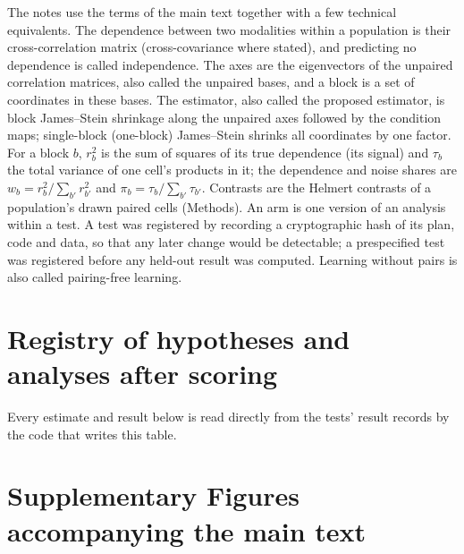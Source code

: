 \documentclass[10pt,a4paper]{article}
\begin{document}
The notes use the terms of the main text together with a few technical equivalents. The dependence between two modalities within a population is their cross-correlation matrix (cross-covariance where stated), and predicting no dependence is called independence. The axes are the eigenvectors of the unpaired correlation matrices, also called the unpaired bases, and a block is a set of coordinates in these bases. The estimator, also called the proposed estimator, is block James--Stein shrinkage along the unpaired axes followed by the condition maps; single-block (one-block) James--Stein shrinks all coordinates by one factor. For a block $b$, $r_b^2$ is the sum of squares of its true dependence (its signal) and $\tau_b$ the total variance of one cell's products in it; the dependence and noise shares are $w_b=r_b^2/\sum_{b'}r_{b'}^2$ and $\pi_b=\tau_b/\sum_{b'}\tau_{b'}$. Contrasts are the Helmert contrasts of a population's drawn paired cells (Methods). An arm is one version of an analysis within a test. A test was registered by recording a cryptographic hash of its plan, code and data, so that any later change would be detectable; a prespecified test was registered before any held-out result was computed. Learning without pairs is also called pairing-free learning.
\section*{Registry of hypotheses and analyses after scoring}
Every estimate and result below is read directly from the tests' result records by the code that writes this table.
\newcommand{\RegistryCaption}{\textbf{Every prespecified hypothesis of the manuscript and every analysis done after scoring.} For each prespecified test, each hypothesis with its criterion, the estimate with its 95\% interval and the result. Savings are ratios of paired cells needed (comparator over the estimator); ``at least'' marks a comparator that did not reach the target within the largest budget. The readout of the validation test, and later the comparison with other methods given the same atlas (K1, K2), were specified after the validation test had been scored and before their own quantities were computed. Below, analyses done after scoring, amendments and deviations, with where they are reported.}
{\footnotesize\setlength{\LTleft}{0pt}\setlength{\LTright}{0pt}\setlength{\LTcapwidth}{\textwidth}
}

\clearpage
\section*{Supplementary Figures accompanying the main text}
\end{document}
